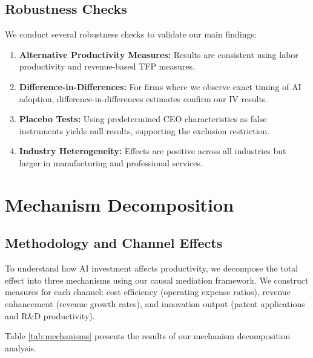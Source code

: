 \documentclass[12pt, a4paper]{article}
\begin{document}
\subsection{Robustness Checks}

We conduct several robustness checks to validate our main findings:

\begin{enumerate}
\item \textbf{Alternative Productivity Measures:} Results are consistent using labor productivity and revenue-based TFP measures.
\item \textbf{Difference-in-Differences:} For firms where we observe exact timing of AI adoption, difference-in-differences estimates confirm our IV results.
\item \textbf{Placebo Tests:} Using predetermined CEO characteristics as false instruments yields null results, supporting the exclusion restriction.
\item \textbf{Industry Heterogeneity:} Effects are positive across all industries but larger in manufacturing and professional services.
\end{enumerate}

\section{Mechanism Decomposition}

\subsection{Methodology and Channel Effects}

To understand how AI investment affects productivity, we decompose the total effect into three mechanisms using our causal mediation framework. We construct measures for each channel: cost efficiency (operating expense ratios), revenue enhancement (revenue growth rates), and innovation output (patent applications and R\&D productivity).

Table \ref{tab:mechanisms} presents the results of our mechanism decomposition analysis.
\end{document}
